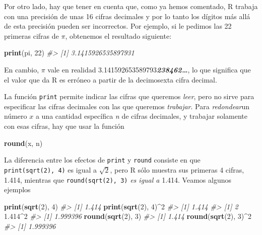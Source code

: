 \documentclass[
]{book}
\newenvironment{Shaded}{\begin{snugshade}}{\end{snugshade}}
\newcommand{\CommentTok}[1]{\textcolor[rgb]{0.56,0.35,0.01}{\textit{#1}}}
\newcommand{\DecValTok}[1]{\textcolor[rgb]{0.00,0.00,0.81}{#1}}
\newcommand{\FloatTok}[1]{\textcolor[rgb]{0.00,0.00,0.81}{#1}}
\newcommand{\KeywordTok}[1]{\textcolor[rgb]{0.13,0.29,0.53}{\textbf{#1}}}
\newcommand{\NormalTok}[1]{#1}
\newcommand{\OperatorTok}[1]{\textcolor[rgb]{0.81,0.36,0.00}{\textbf{#1}}}
\theoremstyle{definition}
\theoremstyle{definition}
\theoremstyle{definition}
\theoremstyle{remark}
\begin{document}
Por otro lado, hay que tener en cuenta que, como ya hemos comentado, R trabaja con una precisión de unas 16 cifras decimales y por lo tanto los dígitos más allá de esta precisión pueden ser incorrectos. Por ejemplo, si le pedimos las 22 primeras cifras de \(\pi\), obtenemos el resultado siguiente:

\begin{Shaded}
\begin{Highlighting}[]
\KeywordTok{print}\NormalTok{(pi, }\DecValTok{22}\NormalTok{)}
\CommentTok{\#\textgreater{} [1] 3.1415926535897931}
\end{Highlighting}
\end{Shaded}

En cambio, \(\pi\) vale en realidad 3.141592653589793\textbf{\emph{238462\ldots{}}}, lo que significa que el valor que da R es erróneo a partir de la decimosexta cifra decimal.

La función \texttt{print} permite indicar las cifras que queremos \emph{leer}, pero no sirve para especificar las cifras decimales con las que queremos \emph{trabajar}.
Para \emph{redondear}un número \(x\) a una cantidad específica \emph{n} de cifras decimales, y trabajar solamente con esas cifras, hay que usar la función

\begin{Shaded}
\begin{Highlighting}[]
\KeywordTok{round}\NormalTok{(x, n)}
\end{Highlighting}
\end{Shaded}

La diferencia entre los efectos de \texttt{print} y \texttt{round} consiste en que \texttt{print(sqrt(2),\ 4)} es igual a \(\sqrt{2}\), pero R sólo muestra sus primeras 4 cifras, 1.414, mientras que \texttt{round(sqrt(2),\ 3)} \emph{es igual a} 1.414. Veamos algunos ejemplos

\begin{Shaded}
\begin{Highlighting}[]
\KeywordTok{print}\NormalTok{(}\KeywordTok{sqrt}\NormalTok{(}\DecValTok{2}\NormalTok{), }\DecValTok{4}\NormalTok{)}
\CommentTok{\#\textgreater{} [1] 1.414}
\KeywordTok{print}\NormalTok{(}\KeywordTok{sqrt}\NormalTok{(}\DecValTok{2}\NormalTok{), }\DecValTok{4}\NormalTok{)}\OperatorTok{\^{}}\DecValTok{2}
\CommentTok{\#\textgreater{} [1] 1.414}
\CommentTok{\#\textgreater{} [1] 2}
\FloatTok{1.414}\OperatorTok{\^{}}\DecValTok{2}
\CommentTok{\#\textgreater{} [1] 1.999396}
\KeywordTok{round}\NormalTok{(}\KeywordTok{sqrt}\NormalTok{(}\DecValTok{2}\NormalTok{), }\DecValTok{3}\NormalTok{)}
\CommentTok{\#\textgreater{} [1] 1.414}
\KeywordTok{round}\NormalTok{(}\KeywordTok{sqrt}\NormalTok{(}\DecValTok{2}\NormalTok{), }\DecValTok{3}\NormalTok{)}\OperatorTok{\^{}}\DecValTok{2}
\CommentTok{\#\textgreater{} [1] 1.999396}
\end{Highlighting}
\end{Shaded}
\end{document}
